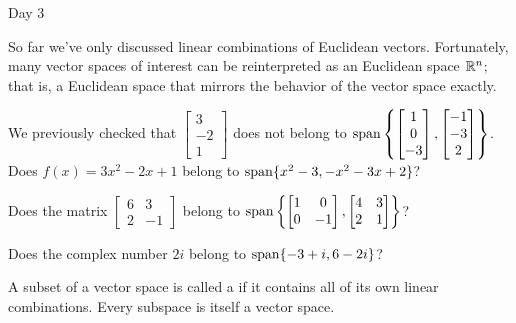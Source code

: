 
\begin{applicationActivities}{Day 3}


\begin{observation}
  So far we've only discussed linear combinations of Euclidean vectors.
  Fortunately, many vector spaces of interest can be reinterpreted as an
   Euclidean space \(\mathbb{R}^n\); that is, a Euclidean space
  that mirrors the behavior of the vector space exactly.
\end{observation}

\begin{activity}{5}
  We previously checked that \(\begin{bmatrix}3\\-2\\1\end{bmatrix}\)
  does not belong to
  \(\operatorname{span}\left\{\begin{bmatrix}1\\0\\-3\end{bmatrix},
  \begin{bmatrix}-1\\-3\\2\end{bmatrix}\right\}\).
  Does \(f(x)=3x^2-2x+1\) belong to
  \(\operatorname{span}\{x^2-3,-x^2-3x+2\}\)?
\end{activity}

\begin{activity}{10}
  Does the matrix \(\begin{bmatrix}6&3\\2&-1\end{bmatrix}\) belong to
  \(\operatorname{span}\left\{\begin{bmatrix}1&0\\0&-1\end{bmatrix},
  \begin{bmatrix}4&3\\2&1\end{bmatrix}\right\}\)?
\end{activity}

\begin{activity}{10}
  Does the complex number \(2i\) belong to
  \(\operatorname{span}\{-3+i,6-2i\}\)?
\end{activity}

\begin{definition}
  A subset of a vector space is called a  if it contains
  all of its own linear combinations. Every subspace is itself a vector space.
\end{definition}


\end{applicationActivities}
